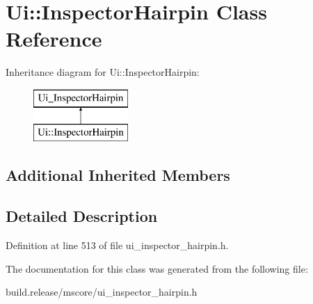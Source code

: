 \hypertarget{class_ui_1_1_inspector_hairpin}{}\section{Ui\+:\+:Inspector\+Hairpin Class Reference}
\label{class_ui_1_1_inspector_hairpin}
Inheritance diagram for Ui\+:\+:Inspector\+Hairpin\+:\begin{figure}[H]
\begin{center}
\leavevmode
\includegraphics[height=2.000000cm]{class_ui_1_1_inspector_hairpin}
\end{center}
\end{figure}
\subsection*{Additional Inherited Members}


\subsection{Detailed Description}


Definition at line 513 of file ui\+\_\+inspector\+\_\+hairpin.\+h.



The documentation for this class was generated from the following file\+:\begin{DoxyCompactItemize}
\item 
build.\+release/mscore/ui\+\_\+inspector\+\_\+hairpin.\+h\end{DoxyCompactItemize}
